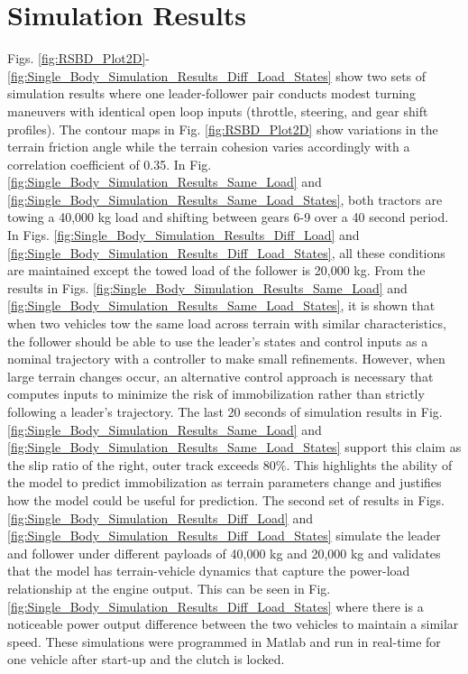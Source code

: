 \section{Simulation Results}
Figs. \ref{fig:RSBD_Plot2D}-\ref{fig:Single_Body_Simulation_Results_Diff_Load_States} show two sets of simulation results where one leader-follower pair conducts modest turning maneuvers with identical open loop inputs (throttle, steering, and gear shift profiles). The contour maps in Fig. \ref{fig:RSBD_Plot2D} show variations in the terrain friction angle while the terrain cohesion varies accordingly with a correlation coefficient of 0.35. In Fig. \ref{fig:Single_Body_Simulation_Results_Same_Load} and \ref{fig:Single_Body_Simulation_Results_Same_Load_States}, both tractors are towing a 40,000 kg load and shifting between gears 6-9 over a 40 second period. In Figs. \ref{fig:Single_Body_Simulation_Results_Diff_Load} and \ref{fig:Single_Body_Simulation_Results_Diff_Load_States}, all these conditions are maintained except the towed load of the follower is 20,000 kg. From the results in Figs. \ref{fig:Single_Body_Simulation_Results_Same_Load} and \ref{fig:Single_Body_Simulation_Results_Same_Load_States}, it is shown that when two vehicles tow the same load across terrain with similar characteristics, the follower should be able to use the leader's states and control inputs as a nominal trajectory with a controller to make small refinements. However, when large terrain changes occur, an alternative control approach is necessary that computes inputs to minimize the risk of immobilization rather than strictly following a leader's trajectory. The last 20 seconds of simulation results in Fig. \ref{fig:Single_Body_Simulation_Results_Same_Load} and \ref{fig:Single_Body_Simulation_Results_Same_Load_States} support this claim as the slip ratio of the right, outer track exceeds $80\%$. This highlights the ability of the model to predict immobilization as terrain parameters change and justifies how the model could be useful for prediction. The second set of results in Figs. \ref{fig:Single_Body_Simulation_Results_Diff_Load} and \ref{fig:Single_Body_Simulation_Results_Diff_Load_States} simulate the leader and follower under different payloads of 40,000 kg and 20,000 kg and validates that the model has terrain-vehicle dynamics that capture the power-load relationship at the engine output. This can be seen in Fig. \ref{fig:Single_Body_Simulation_Results_Diff_Load_States} where there is a noticeable power output difference between the two vehicles to maintain a similar speed. These simulations were programmed in Matlab and run in real-time for one vehicle after start-up and the clutch is locked.

